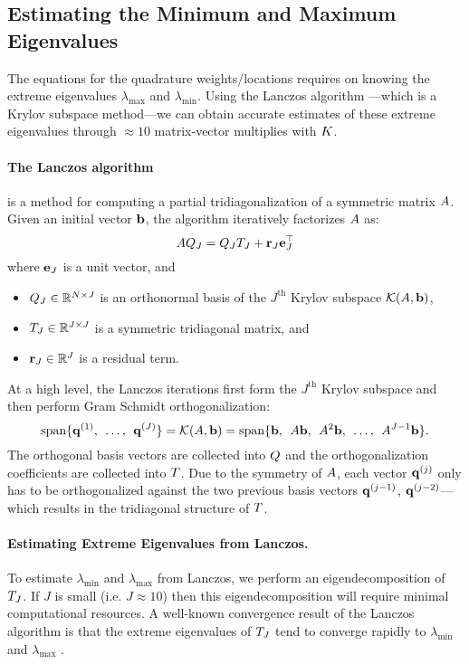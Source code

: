 \subsection{Estimating the Minimum and Maximum Eigenvalues}
The equations for the quadrature weights/locations requires on knowing the extreme eigenvalues $\lambda_\text{max}$ and $\lambda_\text{min}$.
Using the Lanczos algorithm \cite{lanczos1950iteration}---which is a Krylov subspace method---we can obtain accurate estimates of these extreme eigenvalues through $\approx 10$ matrix-vector multiplies with $K$.

\paragraph{The Lanczos algorithm}
is a method for computing a partial tridiagonalization of a symmetric matrix $A$.
Given an initial vector $\mathbf{b}$, the algorithm iteratively factorizes $A$ as:
\[
  A Q_J = Q_J T_J + \mathbf{r}_J \mathbf{e}_J^\top
\]
where $\mathbf{e}_J$ is a unit vector, and
%
\begin{itemize}
  \item $Q_J \in \mathbb{R}^{N \times J}$ is an orthonormal basis of the $J^\text{th}$ Krylov subspace $\mathcal{K}(A, \mathbf{b})$,
	\item $T_J \in \mathbb{R}^{J \times J}$ is a symmetric tridiagonal matrix, and
	\item $\mathbf{r}_J \in \mathbb{R}^J$ is a residual term.
\end{itemize}
%
At a high level, the Lanczos iterations first form the $J^\text{th}$ Krylov subspace and then perform Gram Schmidt orthogonalization:
\[
  \text{span} \{ \mathbf{q}^{(1)}, \:\: \ldots, \:\: \mathbf{q}^{(J)} \} = \mathcal{K}(A, \mathbf{b}) = \text{span} \{ \mathbf{b}, \:\: A\mathbf{b}, \:\: A^2\mathbf{b}, \:\: \ldots, \:\: A^{J-1} \mathbf{b} \}.
\]
The orthogonal basis vectors are collected into $Q$ and the orthogonalization coefficients are collected into $T$.
Due to the symmetry of $A$, each vector $\mathbf{q}^{(j)}$ only has to be orthogonalized against the two previous basis vectors $\mathbf{q}^{(j-1)}$, $\mathbf{q}^{(j-2)}$---which results in the tridiagonal structure of $T$.

\paragraph{Estimating Extreme Eigenvalues from Lanczos.}
To estimate $\lambda_\text{min}$ and $\lambda_\text{max}$ from Lanczos, we perform an eigendecomposition of $T_J$.
If $J$ is small (i.e. $J \approx 10$) then this eigendecomposition will require minimal computational resources.
A well-known convergence result of the Lanczos algorithm is that the extreme eigenvalues of $T_J$ tend to converge rapidly to $\lambda_\text{min}$ and $\lambda_\text{max}$ \cite[e.g.][]{saad2003iterative,golub2012matrix}.


